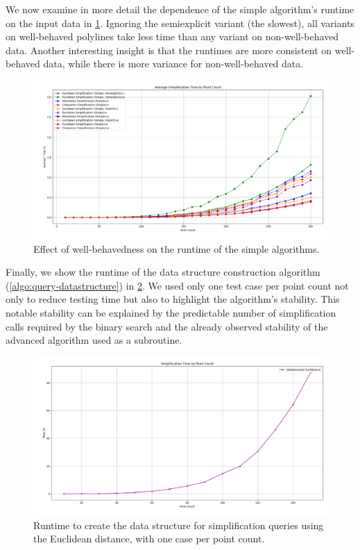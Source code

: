 We now examine in more detail the dependence of the simple algorithm's runtime on the input data in \cref{fig:res_simple}. Ignoring the semiexplicit variant (the slowest), all variants on well-behaved polylines take less time than any variant on non-well-behaved data. Another interesting insight is that the runtimes are more consistent on well-behaved data, while there is more variance for non-well-behaved data.

\begin{figure}[b]
  \centering
	\includegraphics[scale=0.4]{./figures/res_simple.png}
  \caption{Effect of well-behavedness on the runtime of the simple algorithms.}
  \label{fig:res_simple}
\end{figure}

Finally, we show the runtime of the data structure construction algorithm (\cref{algo:query-datastructure}) in \cref{fig:res_ds}. We used only one test case per point count not only to reduce testing time but also to highlight the algorithm's stability. This notable stability can be explained by the predictable number of simplification calls required by the binary search and the already observed stability of the advanced algorithm used as a subroutine.

\begin{figure}[b]
  \centering
	\includegraphics[scale=0.4]{./figures/res_ds.png}
  \caption{Runtime to create the data structure for simplification queries using the Euclidean distance, with one case per point count.}
  \label{fig:res_ds}
\end{figure}

